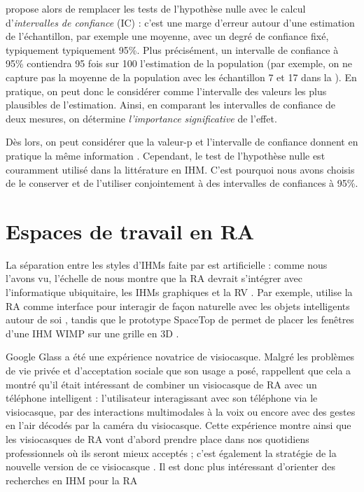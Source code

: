 \cite{Dragicevic2016} propose alors de remplacer les tests de l'hypothèse nulle avec le calcul d'\emph{intervalles de confiance} (IC) : c'est une marge d'erreur autour d'une estimation de l'échantillon, par exemple une moyenne, avec un degré de confiance fixé, typiquement typiquement 95\%. Plus précisément, un intervalle de confiance à 95\% contiendra 95 fois sur 100 l'estimation de la population (par exemple, on ne capture pas la moyenne de la population avec les échantillon 7 et 17 dans la ). En pratique, on peut donc le considérer comme l'intervalle des valeurs les plus plausibles de l'estimation. Ainsi, en comparant les intervalles de confiance de deux mesures, on détermine \emph{l'importance significative} de l'effet.

Dès lors, on peut considérer que la valeur-p et l'intervalle de confiance donnent en pratique la même information \cite{Dragicevic2016}. Cependant, le test de l'hypothèse nulle est couramment utilisé dans la littérature en IHM. C'est pourquoi nous avons choisis de le conserver et de l'utiliser conjointement à des intervalles de confiances à 95\%.


\section{Espaces de travail en RA}
\label{sec:litterature_ar_worspaces}

La séparation entre les styles d'IHMs faite par \cite{Rekimoto1995}  est artificielle : comme nous l'avons vu, l'échelle de \cite{Milgram1994} nous montre que la RA devrait s'intégrer avec l'informatique ubiquitaire, les IHMs graphiques et la RV \cite{Billinghurst2005}. Par exemple, \cite{Heun2013} utilise la RA comme interface pour interagir de façon naturelle avec les objets intelligents autour de soi , tandis que le prototype SpaceTop de \cite{Lee2013} permet de placer les fenêtres d'une IHM WIMP sur une grille en 3D .


Google Glass a été une expérience novatrice de visiocasque. Malgré les problèmes de vie privée et d'acceptation sociale que son usage a posé, \cite{Koelle2015} rappellent que cela a montré qu'il était intéressant de combiner un visiocasque de RA avec un téléphone intelligent : l'utilisateur interagissant avec son téléphone via le visiocasque, par des interactions multimodales à la voix ou encore avec des gestes en l'air décodés par la caméra du visiocasque. Cette expérience montre ainsi que les visiocasques de RA vont d'abord prendre place dans nos quotidiens professionnels où ils seront mieux acceptés ; c'est également la stratégie de la nouvelle version de ce visiocasque \cite{Levy2017}. Il est donc plus intéressant d'orienter des recherches en IHM pour la RA

